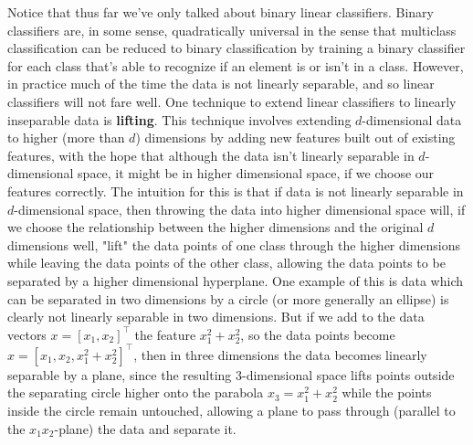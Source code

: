 \documentclass{article}
\begin{document}
\newline \newline
Notice that thus far we've only talked about binary linear classifiers. Binary classifiers are, in some sense, quadratically universal in the sense that multiclass classification can be reduced to binary classification by training a binary classifier for each class that's able to recognize if an element is or isn't in a class. However, in practice much of the time the data is not linearly separable, and so linear classifiers will not fare well. One technique to extend linear classifiers to linearly inseparable data is \textbf{lifting}. This technique involves extending $ d $-dimensional data to higher (more than $ d $) dimensions by adding new features built out of existing features, with the hope that although the data isn't linearly separable in $ d $-dimensional space, it might be in higher dimensional space, if we choose our features correctly. The intuition for this is that if data is not linearly separable in $ d $-dimensional space, then throwing the data into higher dimensional space will, if we choose the relationship between the higher dimensions and the original $ d $ dimensions well, "lift" the data points of one class through the higher dimensions while leaving the data points of the other class, allowing the data points to be separated by a higher dimensional hyperplane.
\newline \newline
One example of this is data which can be separated in two dimensions by a circle (or more generally an ellipse) is clearly not linearly separable in two dimensions. But if we add to the data vectors $ x = [ x_1, x_2 ]^\intercal $ the feature $ x_1^2 + x_2^2 $, so the data points become $ x = [x_1, x_2, x_1^2 + x_2^2]^\intercal $, then in three dimensions the data becomes linearly separable by a plane, since the resulting 3-dimensional space lifts points outside the separating circle higher onto the parabola $ x_3 = x_1^2 + x_2^2 $ while the points inside the circle remain untouched, allowing a plane to pass through (parallel to the $ x_1 x_2 $-plane) the data and separate it.
\end{document}
